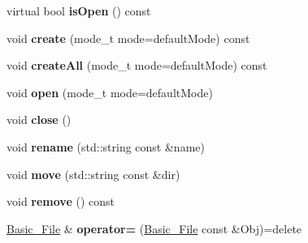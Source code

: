 \begin{DoxyCompactItemize}
\item 
\hypertarget{classstb_1_1Basic__File_a3e35d6f4d647042293ec8128994d5d10}{virtual bool {\bfseries is\+Open} () const }\label{classstb_1_1Basic__File_a3e35d6f4d647042293ec8128994d5d10}

\item 
\hypertarget{classstb_1_1Basic__File_a559a6e5589eac708aca4301895c15788}{void {\bfseries create} (mode\+\_\+t mode=default\+Mode) const }\label{classstb_1_1Basic__File_a559a6e5589eac708aca4301895c15788}

\item 
\hypertarget{classstb_1_1Basic__File_afdbe07f3cdf14cfeaad6c2ed1535c83a}{void {\bfseries create\+All} (mode\+\_\+t mode=default\+Mode) const }\label{classstb_1_1Basic__File_afdbe07f3cdf14cfeaad6c2ed1535c83a}

\item 
\hypertarget{classstb_1_1Basic__File_a9bf8f34255b55752fc9e8c029b1c1b47}{void {\bfseries open} (mode\+\_\+t mode=default\+Mode)}\label{classstb_1_1Basic__File_a9bf8f34255b55752fc9e8c029b1c1b47}

\item 
\hypertarget{classstb_1_1Basic__File_a06d5de39f9e34fff4bb58f072f7c03fd}{void {\bfseries close} ()}\label{classstb_1_1Basic__File_a06d5de39f9e34fff4bb58f072f7c03fd}

\item 
\hypertarget{classstb_1_1Basic__File_a9957b7af640c9f3e9a78d3fc8f0e3b11}{void {\bfseries rename} (std\+::string const \&name)}\label{classstb_1_1Basic__File_a9957b7af640c9f3e9a78d3fc8f0e3b11}

\item 
\hypertarget{classstb_1_1Basic__File_ab7868b7fcad30b6bc319f31ae063a218}{void {\bfseries move} (std\+::string const \&dir)}\label{classstb_1_1Basic__File_ab7868b7fcad30b6bc319f31ae063a218}

\item 
\hypertarget{classstb_1_1Basic__File_a6793b111443f998111fffab72e90f39d}{void {\bfseries remove} () const }\label{classstb_1_1Basic__File_a6793b111443f998111fffab72e90f39d}

\item 
\hypertarget{classstb_1_1Basic__File_a25fdd895f0243cbc9b0ce52abb0d03b0}{\hyperlink{classstb_1_1Basic__File}{Basic\+\_\+\+File} \& {\bfseries operator=} (\hyperlink{classstb_1_1Basic__File}{Basic\+\_\+\+File} const \&Obj)=delete}\label{classstb_1_1Basic__File_a25fdd895f0243cbc9b0ce52abb0d03b0}

\end{DoxyCompactItemize}

